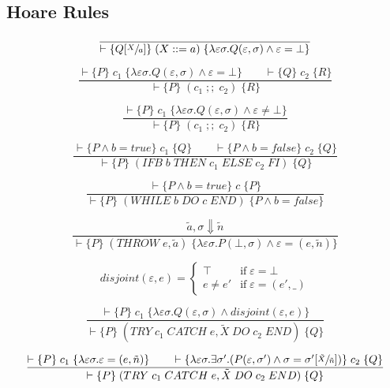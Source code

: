 \subsection{Hoare Rules}

\begin{equation}
\frac{}{\vdash \{Q[\sfrac{X}{a}]\} \; (X ::= a) \; \{\lambda \varepsilon \sigma. Q(\varepsilon, \sigma) \wedge \varepsilon = \bot\}}
\end{equation}

\begin{equation}
\frac{\vdash \{P\} \; c_1 \; \{\lambda \varepsilon \sigma. Q(\varepsilon, \sigma) \wedge \varepsilon = \bot\} \qquad \vdash \{Q\} \; c_2 \; \{R\}}{\vdash \{P\} \; (c_1\; ;;\; c_2) \; \{R\}}
\end{equation}

\begin{equation}
\frac{\vdash \{P\} \; c_1 \; \{\lambda \varepsilon \sigma. Q(\varepsilon, \sigma) \wedge \varepsilon \neq \bot\}}{\vdash \{P\} \; (c_1\; ;;\; c_2) \; \{R\}}
\end{equation}

\begin{equation}
\frac{\vdash \{P \wedge b=true\} \; c_1 \; \{Q\} \qquad \vdash \{P \wedge b=false\} \; c_2 \; \{Q\}}{\vdash \{P\} \; (IFB\; b\; THEN\; c_1\; ELSE\; c_2\; FI) \; \{Q\}}
\end{equation}

\begin{equation}
\frac{\vdash \{P \wedge b = true\} \; c \; \{P\}}{\vdash \{P\} \; (WHILE\; b\; DO\; c\; END) \; \{P \wedge b = false\}}
\end{equation}

\begin{equation}
\frac{\tilde{a}, \sigma \Downarrow \tilde{n}}{\vdash \{P\} \; (THROW\; e, \tilde{a}) \; \{\lambda \varepsilon \sigma. P (\bot, \sigma) \wedge \varepsilon = (e, \tilde{n})\}}
\end{equation}

\begin{equation}
disjoint(\varepsilon, e) = \begin{cases}
\top & \mbox{if} \; \varepsilon = \bot \\
e \neq e' & \mbox{if} \; \varepsilon = (e', \_)
\end{cases}
\end{equation}

\begin{equation}
\frac{\vdash \{P\} \; c_1 \; \{\lambda \varepsilon \sigma. Q(\varepsilon, \sigma) \wedge disjoint(\varepsilon, e)\}}{\vdash \{P\} \; (TRY\; c_1\; CATCH\; e, \tilde{X}\; DO\; c_2\; END) \; \{Q\}}
\end{equation}

\begin{equation}
\frac{\vdash \{P\} \; c_1 \; \{\lambda \varepsilon \sigma. \varepsilon = (e, \tilde{n})\} \qquad \vdash \{\lambda \varepsilon \sigma. \exists \sigma'. (P(\varepsilon, \sigma') \wedge \sigma = \sigma'[\sfrac{\tilde{X}}{\tilde{n}}])\} \; c_2 \; \{Q\}}{\vdash \{P\} \; (TRY\; c_1\; CATCH\; e, \tilde{X}\; DO\; c_2\; END) \; \{Q\}}
\end{equation}